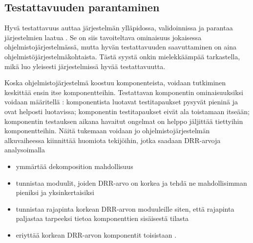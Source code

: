 \documentclass[finnish]{tktltiki2}
\numberwithin{table}{section}
\theoremstyle{definition}
\theoremstyle{remark}
\begin{document}
\subsection{Testattavuuden parantaminen}


Hyvä testattavuus auttaa järjestelmän ylläpidossa, validoinnissa ja parantaa järjestelmien laatua \citep[s. 20]{Voas:1995:STN:624607.625469}. Se on siis tavoiteltava ominaisuus jokaisessa ohjelmistojärjestelmässä, mutta hyvän testattavuuden saavuttaminen on aina ohjelmistöjärjestelmäkohtaista. Tästä syystä onkin mielekkäämpää tarkastella, mikä luo yleisesti järjestelmissä hyvää testattavuutta. 





Koska ohjelmistojärjestelmä koostuu komponenteista, voidaan tutkiminen keskittää ensin itse komponentteihin. Testattavan komponentin ominaisuuksiksi voidaan määritellä \citep{Freedman:1991:TSC:126218.126229}: komponentista luotavat testitapaukset pysyvät pieninä ja ovat helposti luotavissa; komponentin testitapaukset eivät ala toistamaan itseään; komponentin testauksen aikana havaitut ongelmat on helppo jäljittää tiettyihin komponentteihin. Näitä tukemaan voidaan jo ohjelmistojärjestelmän alkuvaiheessa kiinnittää huomiota tekijöihin, jotka saadaan DRR-arvoja analysoimalla \citep{voas_improving_1992} 

\begin{itemize}
	\item ymmärtää dekomposition mahdollisuus
	\item tunnistaa moduulit, joiden DRR-arvo on korkea ja tehdä ne mahdollisimman pieniksi ja yksinkertaisiksi
	\item tunnistaa rajapinta korkean DRR-arvon moduuleille siten, että rajapinta paljastaa tarpeeksi tietoa komponenttien sisäisestä tilasta
	\item eriyttää korkean DRR-arvon komponentit toisistaan \citep[s. 23]{Voas:1995:STN:624607.625469}.
\end{itemize}
\end{document}
